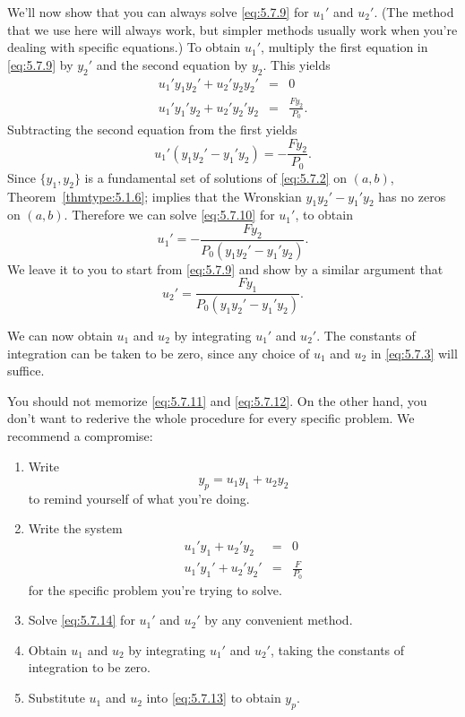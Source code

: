\documentclass{ximera}
\begin{document}
We'll now show that you can always solve \eqref{eq:5.7.9} for $u_1'$
and $u_2'$. (The method that we use here will always work, but simpler
methods usually work when you're dealing with specific equations.) To
obtain $u_1'$, multiply the first equation in \eqref{eq:5.7.9} by $y_2'$
and the second equation by $y_2$. This yields
\begin{eqnarray*}
u_1'y_1y_2'+u_2'y_2y_2'&=& 0  \\
u_1'y_1'y_2+u_2'y_2'y_2 &=& \frac{Fy_2}{P_0}.
\end{eqnarray*}
Subtracting the second equation from the first yields
\begin{equation} \label{eq:5.7.10}
u_1'(y_1y_2'-y_1'y_2)=-\frac{Fy_2}{P_0}.
\end{equation}
Since $\{y_1,y_2\}$  is a fundamental set of solutions of \eqref{eq:5.7.2}
on $(a,b)$, Theorem~\ref{thmtype:5.1.6}; implies that the Wronskian
 $y_1y_2'-y_1'y_2$  has no zeros on $(a,b)$.  Therefore we can solve
\eqref{eq:5.7.10} for $u_1'$, to obtain
\begin{equation} \label{eq:5.7.11}
u_1'=-\frac{Fy_2}{P_0(y_1y_2'-y_1'y_2)}.
\end{equation}
We leave it to you to start from \eqref{eq:5.7.9} and show by a similar
argument that
\begin{equation} \label{eq:5.7.12}
u_2'=\frac{Fy_1}{P_0(y_1y_2'-y_1'y_2)}.
\end{equation}

We can now obtain $u_1$ and $u_2$ by integrating $u_1'$ and $u_2'$.
The constants of integration can be taken to be zero, since any choice
of $u_1$ and $u_2$ in \eqref{eq:5.7.3} will suffice.

You should not memorize \eqref{eq:5.7.11} and \eqref{eq:5.7.12}. On the
other hand, you don't want to rederive the whole procedure for every
specific problem. We recommend a compromise:
\begin{enumerate}
\item\label{item:compromiseA} %
Write
\begin{equation} \label{eq:5.7.13}
y_p=u_1y_1+u_2y_2
\end{equation}
to remind yourself of what you're doing.
\item \label{item:compromiseB}%
Write the system
\begin{equation} \label{eq:5.7.14}
\begin{array}{rcl}
u_1'y_1+u_2'y_2 &=& 0  \\
u_1'y_1'+u_2'y_2' &=& \frac{F}{P_0}
\end{array}
\end{equation}
for the specific problem  you're trying to solve.
\item\label{item:compromiseC} %
Solve \eqref{eq:5.7.14} for $u_1'$ and $u_2'$ by any convenient method.
\item \label{item:compromiseD}%
Obtain $u_1$ and $u_2$ by integrating $u_1'$ and $u_2'$,
taking the constants of integration to be zero.
\item \label{item:compromiseE}%
Substitute $u_1$ and $u_2$ into \eqref{eq:5.7.13}  to obtain $y_p$.
\end{enumerate}
\end{document}
